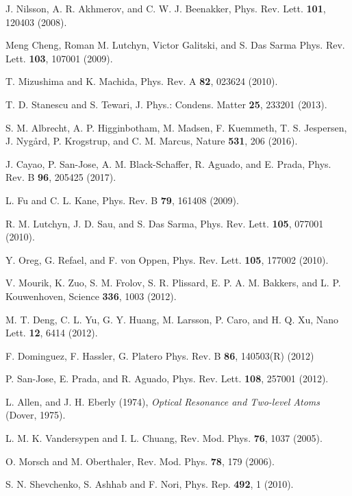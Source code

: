 \documentclass[aps,prl,twocolumn,showpacs,showpacs,10pt,superscriptaddress]{revtex4-1}
\begin{document}
\begin{thebibliography}{00}

	J. Nilsson, A. R. Akhmerov, and C. W. J. Beenakker, Phys. Rev. Lett. \textbf{101}, 120403 (2008).

 Meng Cheng, Roman M. Lutchyn, Victor Galitski, and S. Das Sarma Phys. Rev. Lett. \textbf{103}, 107001 (2009).

 T. Mizushima and K. Machida, Phys. Rev. A \textbf{82}, 023624 (2010).

 T. D. Stanescu and S. Tewari, J. Phys.: Condens. Matter \textbf{25}, 233201 (2013).

 S. M. Albrecht, A. P. Higginbotham, M. Madsen, F. Kuemmeth, T. S. Jespersen, J. Nyg{\aa}rd, P. Krogstrup, and C. M. Marcus, Nature \textbf{531}, 206 (2016).

 J. Cayao, P. San-Jose, A. M. Black-Schaffer, R. Aguado, and E. Prada, Phys. Rev. B \textbf{96}, 205425 (2017).

 L. Fu and C. L. Kane, Phys. Rev. B \textbf{79}, 161408 (2009).

 R. M. Lutchyn, J. D. Sau, and S. Das Sarma, Phys. Rev. Lett. \textbf{105}, 077001 (2010).

 Y. Oreg, G. Refael, and F. von Oppen, Phys. Rev. Lett. \textbf{105},
177002 (2010).

 V. Mourik, K. Zuo, S. M. Frolov, S. R. Plissard, E. P. A. M. Bakkers, and L. P. Kouwenhoven, Science \textbf{336}, 1003 (2012).

 M. T. Deng, C. L. Yu, G. Y. Huang, M. Larsson, P. Caro, and H. Q. Xu, Nano Lett. \textbf{12}, 6414 (2012).

 F. Dominguez, F. Hassler, G. Platero Phys. Rev. B \textbf{86}, 140503(R) (2012)

 P. San-Jose, E. Prada, and R. Aguado, Phys. Rev. Lett. \textbf{108}, 257001 (2012).

 L. Allen, and J. H. Eberly (1974), {\it Optical Resonance and Two-level Atoms} (Dover, 1975).

 L. M. K. Vandersypen and I. L. Chuang, Rev. Mod. Phys. \textbf{76}, 1037 (2005).

 O. Morsch and M. Oberthaler, Rev. Mod. Phys. \textbf{78}, 179 (2006).

 S. N. Shevchenko, S. Ashhab and F. Nori, Phys. Rep. \textbf{492}, 1 (2010).







\end{thebibliography}
\end{document}
